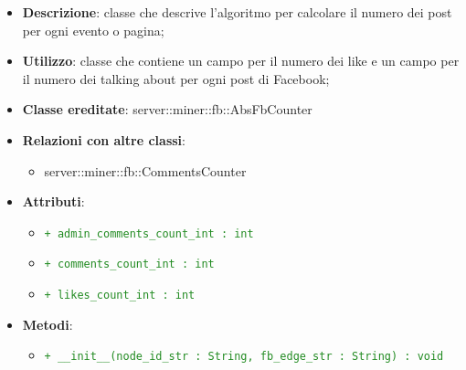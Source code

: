 			\begin{itemize}
				\item \textbf{Descrizione}: classe che descrive l'algoritmo per calcolare il numero dei post per ogni evento o pagina;
				\item \textbf{Utilizzo}: classe che contiene un campo per il numero dei like e un campo per il numero dei talking about per ogni post di Facebook;
				\item \textbf{Classe ereditate}: server::miner::fb::AbsFbCounter
				\item \textbf{Relazioni con altre classi}:
					\begin{itemize}
						\item server::miner::fb::CommentsCounter
					\end{itemize}
				\item \textbf{Attributi}:  
					\begin{itemize}
						\item \textcolor{forestgreen}{\texttt{+ admin\_comments\_count\_int : int}}
						\item \textcolor{forestgreen}{\texttt{+ comments\_count\_int : int}}
						\item \textcolor{forestgreen}{\texttt{+ likes\_count\_int : int}}
					\end{itemize}
				\item \textbf{Metodi}:  
					\begin{itemize}
						\item \textcolor{forestgreen}{\texttt{+ \_\_init\_\_(node\_id\_str : String, fb\_edge\_str : String) : void}}
\end{itemize}
\end{itemize}
